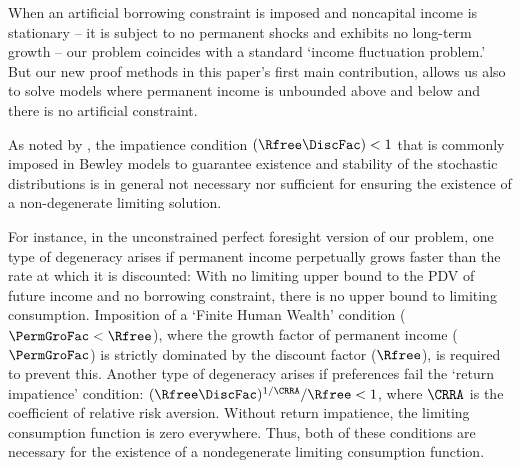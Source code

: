 \documentclass[BufferStockTheory]{subfiles}
\begin{document}


\newcommand{\APFacRaw}{(\Rfree\DiscFac)^{1/\CRRA}}
When an artificial borrowing constraint is imposed and noncapital income is stationary -- it is subject to no permanent shocks and exhibits no long-term growth %
-- our problem coincides with a standard `income fluctuation problem.' But our new proof methods in this paper's first main contribution, allows us also to solve models where permanent income is unbounded above and below and there is no artificial constraint.

As noted by \cite{szeidlInvariant}, the impatience condition $(\Rfree \DiscFac) < 1$ that is commonly imposed in Bewley models to guarantee existence and stability of the stochastic distributions is in general not necessary nor sufficient for ensuring the existence of a non-degenerate limiting solution.

For instance, in the unconstrained perfect foresight version of our problem, one type of degeneracy arises if permanent income perpetually grows faster than the rate at which it is discounted: With no limiting upper bound to the PDV of future income and no borrowing constraint, there is no upper bound to limiting consumption. Imposition of a `Finite Human Wealth' condition ($\PermGroFac < \Rfree$), where the growth factor of permanent income ($\PermGroFac$) is strictly dominated by the discount factor ($\Rfree$), is required to prevent this. Another type of degeneracy arises if preferences fail the `return impatience' condition: $\APFacRaw/\Rfree < 1$, where $\CRRA$ is the coefficient of relative risk aversion. Without return impatience, the limiting consumption function is zero everywhere. Thus, both of these conditions are necessary for the existence of a nondegenerate limiting consumption function.

\end{document}
